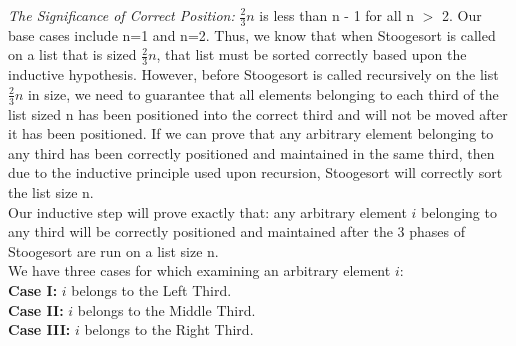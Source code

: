\documentclass[11pt, solution, letterpaper]{format}
\begin{document}
\emph{The Significance of Correct Position:} $\frac{2}{3}n$ is less than n - 1 for all n $>$ 2. Our base cases include n=1 and n=2. Thus, we know that when Stoogesort is called on a list that is sized $\frac{2}{3}n$, that list must be sorted correctly based upon the inductive hypothesis. However, before Stoogesort is called recursively on the list $\frac{2}{3}n$ in size, we need to guarantee that all elements belonging to each third of the list sized n has been positioned into the correct third and will not be moved after it has been positioned.  If we can prove that any arbitrary element belonging to any third has been correctly positioned and maintained in the same third, then due to the inductive principle used upon recursion, Stoogesort will correctly sort the list size n. \\

Our inductive step will prove exactly that: any arbitrary element $i$ belonging to any third will be correctly positioned and maintained after the 3 phases of Stoogesort are run on a list size n. \\
 
 We have three cases for which examining an arbitrary element $i$:\\
\textbf{Case I:} $i$ belongs to the Left Third.\\
\textbf{Case II:} $i$ belongs to the Middle Third.\\
\textbf{Case III:} $i$ belongs to the Right Third.\\
\end{document}
